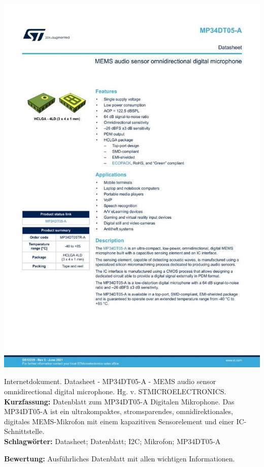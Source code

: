 {
\begin{minipage}{0.38\textwidth}
	\includegraphics[width=\linewidth]{images/STM3.jpg}
\end{minipage}
\hfill
\begin{minipage}{0.6\textwidth}
Internetdokument. Datasheet - MP34DT05-A - MEMS audio sensor omnidirectional digital microphone. Hg. v. STMICROELECTRONICS.
\\ \textbf{Kurzfassung:}
Datenblatt zum MP34DT05-A Digitalen Mikrophone. Das MP34DT05-A ist ein ultrakompaktes, stromsparendes, omnidirektionales, digitales MEMS-Mikrofon mit einem kapazitiven Sensorelement und einer IC-Schnittstelle.
\\ \textbf{Schlagwörter:}
Datasheet; Datenblatt; I2C; Mikrofon; MP34DT05-A
\end{minipage}
\textbf{Bewertung:}
Ausführliches Datenblatt mit allen wichtigen Informationen.
}

